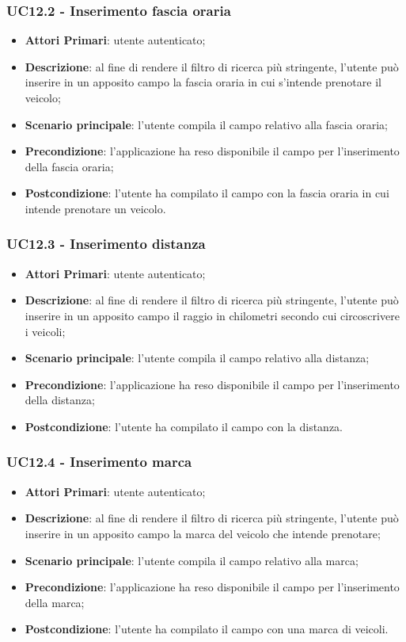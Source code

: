 \subsubsection{UC12.2 - Inserimento fascia oraria}
\begin{itemize}
	\item \textbf{Attori Primari}: utente autenticato;
	\item \textbf{Descrizione}: al fine di rendere il filtro di ricerca più stringente, l'utente può inserire in un apposito campo la fascia oraria in cui s'intende prenotare il veicolo;
	\item \textbf{Scenario principale}: l'utente compila il campo relativo alla fascia oraria;	
	\item \textbf{Precondizione}: l'applicazione ha reso disponibile il campo per l'inserimento della fascia oraria;
	\item \textbf{Postcondizione}: l'utente ha compilato il campo con la fascia oraria in cui intende prenotare un veicolo.	
\end{itemize}
\subsubsection{UC12.3 - Inserimento distanza}
\begin{itemize}
	\item \textbf{Attori Primari}: utente autenticato;
	\item \textbf{Descrizione}: al fine di rendere il filtro di ricerca più stringente, l'utente può inserire in un apposito campo il raggio in chilometri secondo cui circoscrivere i veicoli;
	\item \textbf{Scenario principale}: l'utente compila il campo relativo alla distanza;	
	\item \textbf{Precondizione}: l'applicazione ha reso disponibile il campo per l'inserimento della distanza;
	\item \textbf{Postcondizione}: l'utente ha compilato il campo con la distanza.	
\end{itemize}
\subsubsection{UC12.4 - Inserimento marca}
\begin{itemize}
	\item \textbf{Attori Primari}: utente autenticato;
	\item \textbf{Descrizione}: al fine di rendere il filtro di ricerca più stringente, l'utente può inserire in un apposito campo la marca del veicolo che intende prenotare;
	\item \textbf{Scenario principale}: l'utente compila il campo relativo alla marca;	
	\item \textbf{Precondizione}: l'applicazione ha reso disponibile il campo per l'inserimento della marca;
	\item \textbf{Postcondizione}: l'utente ha compilato il campo con una marca di veicoli.	
\end{itemize}

